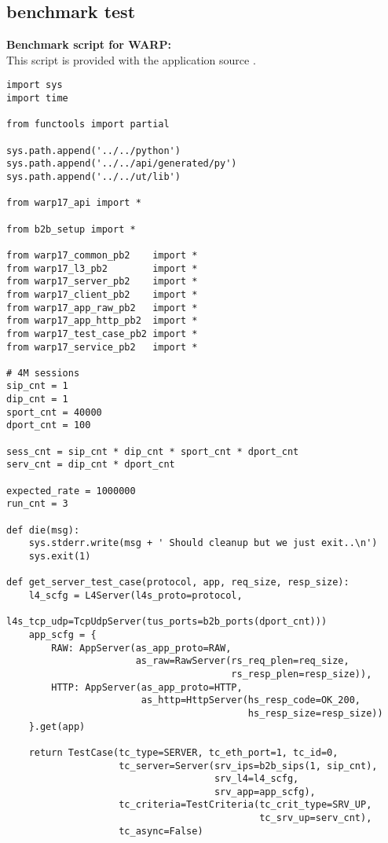 \begin{landscape}
\section{benchmark test}\label{app:benchmark}

\textbf{Benchmark script for WARP:}\\
This script is provided with the application source \cite{juniperwarp17bm}.
\begin{verbatim}
import sys
import time

from functools import partial

sys.path.append('../../python')
sys.path.append('../../api/generated/py')
sys.path.append('../../ut/lib')

from warp17_api import *

from b2b_setup import *

from warp17_common_pb2    import *
from warp17_l3_pb2        import *
from warp17_server_pb2    import *
from warp17_client_pb2    import *
from warp17_app_raw_pb2   import *
from warp17_app_http_pb2  import *
from warp17_test_case_pb2 import *
from warp17_service_pb2   import *

# 4M sessions
sip_cnt = 1
dip_cnt = 1
sport_cnt = 40000
dport_cnt = 100

sess_cnt = sip_cnt * dip_cnt * sport_cnt * dport_cnt
serv_cnt = dip_cnt * dport_cnt

expected_rate = 1000000
run_cnt = 3

def die(msg):
    sys.stderr.write(msg + ' Should cleanup but we just exit..\n')
    sys.exit(1)

def get_server_test_case(protocol, app, req_size, resp_size):
    l4_scfg = L4Server(l4s_proto=protocol,
                       l4s_tcp_udp=TcpUdpServer(tus_ports=b2b_ports(dport_cnt)))
    app_scfg = {
        RAW: AppServer(as_app_proto=RAW,
                       as_raw=RawServer(rs_req_plen=req_size,
                                        rs_resp_plen=resp_size)),
        HTTP: AppServer(as_app_proto=HTTP,
                        as_http=HttpServer(hs_resp_code=OK_200,
                                           hs_resp_size=resp_size))
    }.get(app)

    return TestCase(tc_type=SERVER, tc_eth_port=1, tc_id=0,
                    tc_server=Server(srv_ips=b2b_sips(1, sip_cnt),
                                     srv_l4=l4_scfg,
                                     srv_app=app_scfg),
                    tc_criteria=TestCriteria(tc_crit_type=SRV_UP,
                                             tc_srv_up=serv_cnt),
                    tc_async=False)


\end{verbatim}
\end{landscape}
